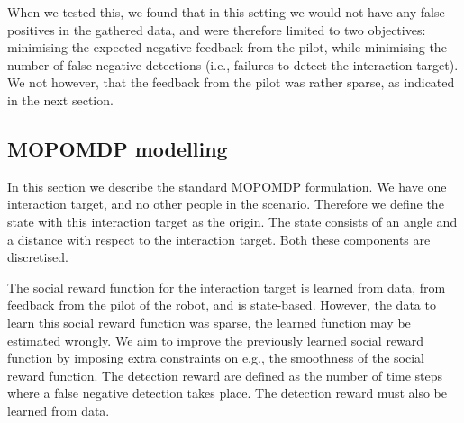 \documentclass[a4paper,11pt]{report}
\begin{document}
When we tested this, we found that in this setting we would not have any false positives in the gathered data, and were therefore limited to two objectives: minimising the expected negative feedback from the pilot, while minimising the number of false negative detections (i.e., failures to detect the interaction target). We not however, that the feedback from the pilot was rather sparse, as indicated in the next section. 

\subsection{MOPOMDP modelling}

In this section we describe the standard MOPOMDP formulation. We have one interaction target, and no other people in the scenario. Therefore we define the state with this interaction target as the origin. The state consists of an angle and a distance with respect to the interaction target. Both these components are discretised. 

The social reward function for the interaction target is learned from data, from feedback from the pilot of the robot, and is state-based. However, the data to learn this social reward function was sparse, the learned function may be estimated wrongly. We aim to improve the previously learned social reward function by imposing extra constraints on e.g., the smoothness of the social reward function. The detection reward are defined as the number of time steps where a false negative detection takes place.  The detection reward must also be learned from data.
\end{document}
